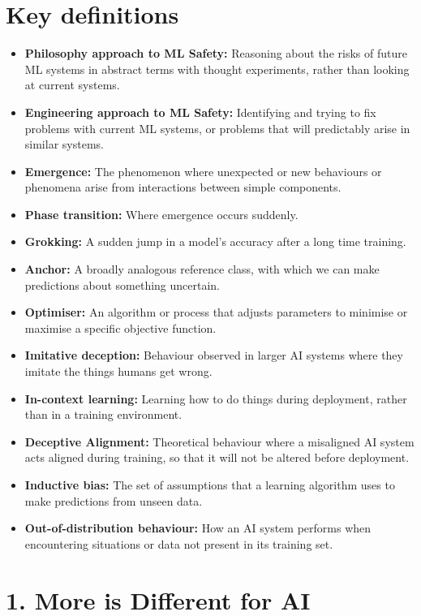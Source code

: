 \documentclass{article}
\begin{document}
\begin{multicols}{2}
\section*{Key definitions}
\begin{itemize}
\item \textbf{Philosophy approach to ML Safety:} Reasoning about the risks of future ML systems in abstract terms with thought experiments, rather than looking at current systems.
\item \textbf{Engineering approach to ML Safety:} Identifying and trying to fix problems with current ML systems, or problems that will predictably arise in similar systems.
\item \textbf{Emergence:} The phenomenon where unexpected or new behaviours or phenomena arise from interactions between simple components.
\item \textbf{Phase transition:} Where emergence occurs suddenly.
\item \textbf{Grokking:} A sudden jump in a model's accuracy after a long time training.
\item \textbf{Anchor:} A broadly analogous reference class, with which we can make predictions about something uncertain.
\item \textbf{Optimiser:} An algorithm or process that adjusts parameters to minimise or maximise a specific objective function.
\item \textbf{Imitative deception:} Behaviour observed in larger AI systems where they imitate the things humans get wrong.
\item \textbf{In-context learning:} Learning how to do things during deployment, rather than in a training environment.
\item \textbf{Deceptive Alignment:} Theoretical behaviour where a misaligned AI system acts aligned during training, so that it will not be altered before deployment.
\item \textbf{Inductive bias:} The set of assumptions that a learning algorithm uses to make predictions from unseen data.
\item \textbf{Out-of-distribution behaviour:} How an AI system performs when encountering situations or data not present in its training set.
\end{itemize}


\section*{1. More is Different for AI}


\end{multicols}
\end{document}
